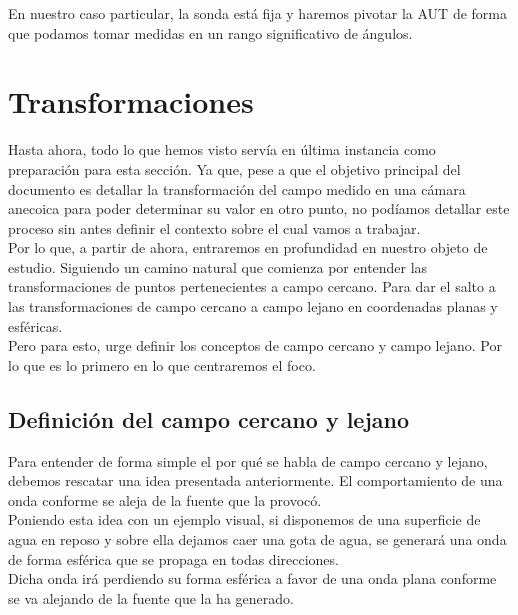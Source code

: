 \documentclass{article}
\begin{document}
En nuestro caso particular, la sonda está fija y haremos pivotar la AUT de forma que podamos tomar medidas en un rango significativo de ángulos.

\newpage
\section{Transformaciones}

Hasta ahora, todo lo que hemos visto servía en última instancia como preparación para esta sección. Ya que, pese a que el objetivo principal del documento es detallar la transformación del campo medido en una cámara anecoica para poder determinar su valor en otro punto, no podíamos detallar este proceso sin antes definir el contexto sobre el cual vamos a trabajar.
\\

Por lo que, a partir de ahora, entraremos en profundidad en nuestro objeto de estudio. Siguiendo un camino natural que comienza por entender las transformaciones de puntos pertenecientes a campo cercano. Para dar el salto a las transformaciones de campo cercano a campo lejano en coordenadas planas y esféricas.
\\

Pero para esto, urge definir los conceptos de campo cercano y campo lejano. Por lo que es lo primero en lo que centraremos el foco.

\subsection{Definición del campo cercano y lejano}

Para entender de forma simple el por qué se habla de campo cercano y lejano, debemos rescatar una idea presentada anteriormente. El comportamiento de una onda conforme se aleja de la fuente que la provocó.
\\

Poniendo esta idea con un ejemplo visual, si disponemos de una superficie de agua en reposo y sobre ella dejamos caer una gota de agua, se generará una onda de forma esférica que se propaga en todas direcciones.
\\
Dicha onda irá perdiendo su forma esférica a favor de una onda plana conforme se va alejando de la fuente que la ha generado.
\\
\end{document}
